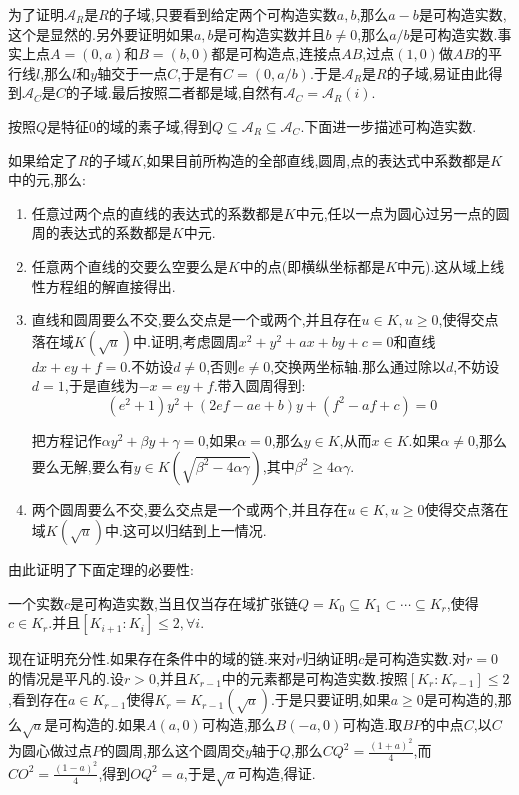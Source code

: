 为了证明$\mathscr{A}_R$是$R$的子域,只要看到给定两个可构造实数$a,b$,那么$a-b$是可构造实数,这个是显然的.另外要证明如果$a,b$是可构造实数并且$b\not=0$,那么$a/b$是可构造实数.事实上点$A=(0,a)$和$B=(b,0)$都是可构造点,连接点$AB$,过点$(1,0)$做$AB$的平行线$l$,那么$l$和$y$轴交于一点$C$,于是有$C=(0,a/b)$.于是$\mathscr{A}_R$是$R$的子域,易证由此得到$\mathscr{A}_C$是$C$的子域.最后按照二者都是域,自然有$\mathscr{A} _C=\mathscr{A}_R(i)$.

按照$Q$是特征0的域的素子域,得到$Q\subseteq \mathscr{A}_R\subseteq \mathscr{A}_C$.下面进一步描述可构造实数.

如果给定了$R$的子域$K$,如果目前所构造的全部直线,圆周,点的表达式中系数都是$K$中的元,那么:
\begin{enumerate}
	\item 任意过两个点的直线的表达式的系数都是$K$中元,任以一点为圆心过另一点的圆周的表达式的系数都是$K$中元.
	\item 任意两个直线的交要么空要么是$K$中的点(即横纵坐标都是$K$中元).这从域上线性方程组的解直接得出.
	\item 直线和圆周要么不交,要么交点是一个或两个,并且存在$u\in K,u\ge0$,使得交点落在域$K(\sqrt{u})$中.证明,考虑圆周$x^2+y^2+ax+by+c=0$和直线$dx+ey+f=0$.不妨设$d\not=0$,否则$e\not=0$,交换两坐标轴.那么通过除以$d$,不妨设$d=1$,于是直线为$-x=ey+f$.带入圆周得到:
	$$(e^2+1)y^2+(2ef-ae+b)y+(f^2-af+c)=0$$
	
	把方程记作$\alpha y^2+\beta y+\gamma=0$,如果$\alpha=0$,那么$y\in K$,从而$x\in K$.如果$\alpha\not=0$,那么要么无解,要么有$y\in K(\sqrt{\beta^2-4\alpha\gamma})$,其中$\beta^2\ge 4\alpha\gamma$.
	\item 两个圆周要么不交,要么交点是一个或两个,并且存在$u\in K,u\ge0$使得交点落在域$K(\sqrt{u})$中.这可以归结到上一情况.
\end{enumerate}

由此证明了下面定理的必要性:

一个实数$c$是可构造实数,当且仅当存在域扩张链$Q=K_0\subseteq K_1\subset\cdots\subseteq K_r$,使得$c\in K_r$.并且$[K_ {i+1}:K_i]\le2,\forall i$.

现在证明充分性.如果存在条件中的域的链.来对$r$归纳证明$c$是可构造实数.对$r=0$的情况是平凡的.设$r>0$,并且$K_{r-1}$中的元素都是可构造实数.按照$[K_r:K_{r-1}]\le2$,看到存在$a\in K_{r-1}$使得$K_r=K_ {r-1}(\sqrt{a})$.于是只要证明,如果$a\ge0$是可构造的,那么$\sqrt{a}$是可构造的.如果$A(a,0)$可构造,那么$B(-a,0)$可构造.取$BP$的中点$C$,以$C$为圆心做过点$P$的圆周,那么这个圆周交$y$轴于$Q$,那么$CQ^2=\frac{(1+a)^2} {4}$,而$CO^2=\frac{(1-a)^2}{4}$,得到$OQ^2=a$,于是$\sqrt{a}$可构造,得证.

